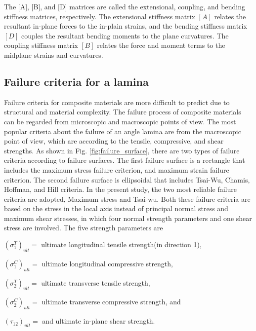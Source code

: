 \documentclass[letterpaper]{IEEEtran}
\begin{document}
The [A], [B], and [D] matrices are called the extensional, coupling, and bending stiffness matrices,
respectively. The extensional stiffness matrix $[A]$ relates the resultant in-plane forces to the
in-plain strains, and the bending stiffness matrix $[D]$ couples the resultant bending moments to
the plane curvatures.  The coupling stiffness matrix $[B]$ relates the force and moment terms to the
midplane strains and curvatures.

\subsection{Failure criteria for a lamina}

Failure criteria for composite materials are more difficult to predict due to
structural and material complexity. The failure process of composite materials
can be regarded from microscopic and macroscopic points of view. The most
popular criteria about the failure of an angle lamina are from the macroscopic
point of view, which are according to the tensile, compressive, and shear
strengths. As shown in Fig. \ref{fig:failure_surface}, there are two types of failure
criteria\cite{massard1984computer,reddy1987first,fang1993design,soeiro1994multilevel,pelletier2006multi,jadhav2007parametric,omkar2008artificial,choudhury2019failure}
according to failure surfaces. The first failure surface is a rectangle that
includes the maximum stress failure criterion\cite{watkins1987multicriteria},
and maximum strain failure criterion. The second failure surface is ellipsoidal
that includes Tsai-Wu\cite{martin1987optimum,soares1995discrete}, Chamis,
Hoffman, and Hill criteria. In the present study, the two most reliable failure
criteria are adopted, Maximum stress and Tsai-wu. Both these failure criteria
are based on the stress in the local axis instead of principal normal stress and
maximum shear stresses, in which four normal strength parameters and one shear
stress are involved. The five strength parameters are

$(\sigma _1^{T})_{ult}= $ ultimate longitudinal tensile strength(in direction 1),

$(\sigma _1^{C})_{ult}= $ ultimate longitudinal compressive strength,

$(\sigma _2^{T})_{ult}= $ ultimate transverse tensile strength,

$(\sigma _2^{C})_{ult}= $ ultimate transverse compressive strength, and

$(\tau_{12})_{ult}= $ and ultimate in-plane shear strength.
\end{document}
